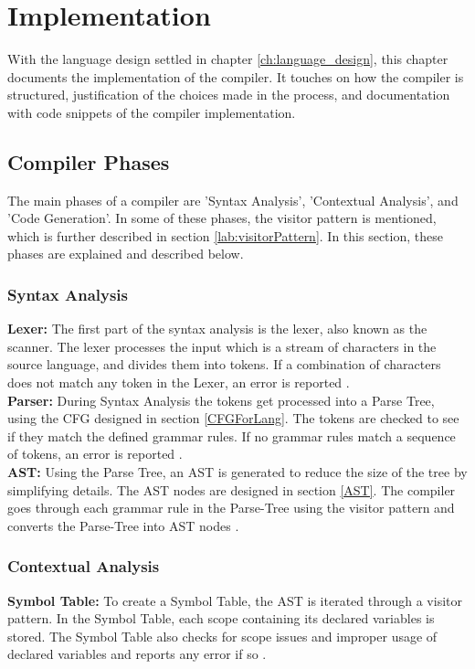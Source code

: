\chapter{Implementation}\label{ch:implementation}
With the language design settled in chapter \ref{ch:language_design}, this chapter documents the implementation of the \lang compiler. It touches on how the compiler is structured, justification of the choices made in the process, and documentation with code snippets of the compiler implementation.

\section{Compiler Phases}
The main phases of a compiler are 'Syntax Analysis', 'Contextual Analysis', and 'Code Generation'. In some of these phases, the visitor pattern is mentioned, which is further described in section \ref{lab:visitorPattern}. In this section, these phases are explained and described below.

\subsection{Syntax Analysis}
\noindent\textbf{Lexer:} The first part of the syntax analysis is the lexer, also known as the scanner. The lexer processes the input which is a stream of characters in the source language, and divides them into tokens. If a combination of characters does not match any token in the Lexer, an error is reported \cite{SPO_Topic_3}.\\

\noindent\textbf{Parser:} During Syntax Analysis the tokens get processed into a Parse Tree, using the CFG designed in section \ref{CFGForLang}. The tokens are checked to see if they match the defined grammar rules. If no grammar rules match a sequence of tokens, an error is reported \cite{SPO_Topic_3}. \\

\noindent
\textbf{AST:} Using the Parse Tree, an AST is generated to reduce the size of the tree by simplifying details. The AST nodes are designed in section \ref{AST}. The compiler goes through each grammar rule in the Parse-Tree using the visitor pattern and converts the Parse-Tree into AST nodes \cite{SPO_Topic_3}. 

\subsection{Contextual Analysis}
\noindent \textbf{Symbol Table:} To create a Symbol Table, the AST is iterated through a visitor pattern. 
In the Symbol Table, each scope containing its declared variables is stored. The Symbol Table also checks for scope issues and improper usage of declared variables and reports any error if so \cite{SPO_Topic_3}.\\

